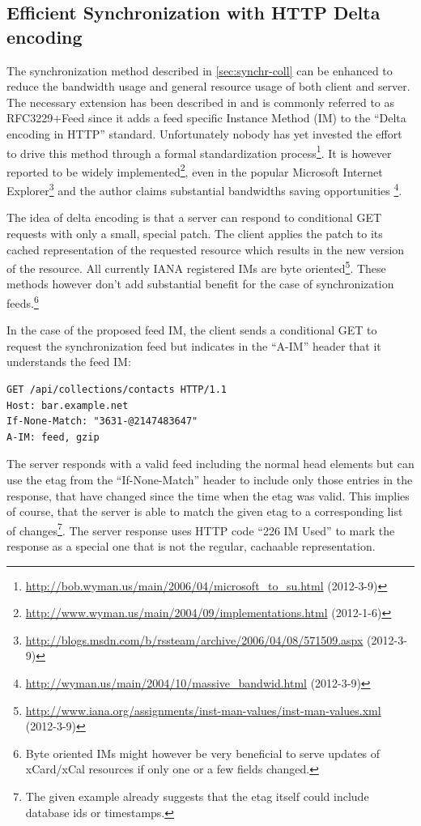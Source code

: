 \documentclass[12pt,a4paper,twoside]{scrartcl}		%
\newcommand{\citeurl}[2]{\url{#1} (#2)}
\begin{document}
\subsection{Efficient Synchronization with HTTP Delta encoding}
\label{sec:effic-synchr-with}

The synchronization method described in \autoref{sec:synchr-coll} can be
enhanced to reduce the bandwidth usage and general resource usage of both client
and server. The necessary extension has been described in \cite{Wyman2004} and
is commonly referred to as RFC3229+Feed since it adds a feed specific Instance
Method (IM) to the ``Delta encoding in HTTP''
standard\cite{RFC3229}. Unfortunately nobody has yet invested the effort to
drive this method through a formal standardization
process\footnote{\citeurl{http://bob.wyman.us/main/2006/04/microsoft_to_su.html}{2012-3-9}}. It
is however reported to be widely
implemented\footnote{\citeurl{http://www.wyman.us/main/2004/09/implementations.html}{2012-1-6}},
even in the popular Microsoft Internet
Explorer\footnote{\citeurl{http://blogs.msdn.com/b/rssteam/archive/2006/04/08/571509.aspx}{2012-3-9}}
and the author claims substantial bandwidths saving opportunities
\footnote{\citeurl{http://wyman.us/main/2004/10/massive_bandwid.html}{2012-3-9}}.

The idea of delta encoding is that a server can respond to conditional GET
requests with only a small, special patch. The client applies the patch to its
cached representation of the requested resource which results in the new version
of the resource. All currently IANA registered IMs are byte
oriented\footnote{\citeurl{http://www.iana.org/assignments/inst-man-values/inst-man-values.xml}{2012-3-9}}. These
methods however don't add substantial benefit for the case of synchronization
feeds.\footnote{Byte oriented IMs might however be very beneficial to serve
  updates of xCard/xCal resources if only one or a few fields changed.}

In the case of the proposed feed IM, the client sends a conditional GET to
request the synchronization feed but indicates in the ``A-IM'' header that it
understands the feed IM:
\begin{lstlisting}
GET /api/collections/contacts HTTP/1.1
Host: bar.example.net
If-None-Match: "3631-@2147483647"
A-IM: feed, gzip
\end{lstlisting}
The server responds with a valid feed including the normal head elements but can
use the etag from the ``If-None-Match'' header to include only those entries in
the response, that have changed since the time when the etag was valid. This
implies of course, that the server is able to match the given etag to a
corresponding list of changes\footnote{The given example already suggests that
  the etag itself could include database ids or timestamps.}. The server
response uses HTTP code ``226 IM Used''\cite{RFC3229} to mark the response as a
special one that is not the regular, cachaable representation.
\end{document}
